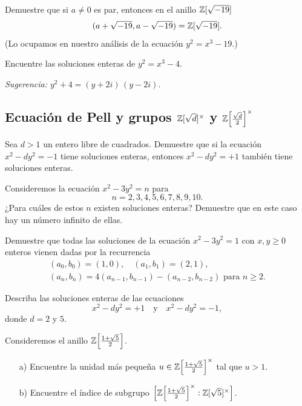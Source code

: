 \begin{ejercicio}
  Demuestre que si $a \ne 0$ es par, entonces en el anillo $\mathbb{Z} [\sqrt{-19}]$
  $$(a + \sqrt{-19}, a - \sqrt{-19}) = \mathbb{Z} [\sqrt{-19}].$$
  (Lo ocupamos en nuestro análisis de la ecuación $y^2 = x^3 - 19$.)
\end{ejercicio}

\begin{ejercicio}
  Encuentre las soluciones enteras de $y^2 = x^3 - 4$.

  \emph{Sugerencia: $y^2 + 4 = (y + 2i)\,(y - 2i)$.}
\end{ejercicio}

\subsection*{Ecuación de Pell y grupos $\mathbb{Z} [\sqrt{d}]^\times$ y $\mathbb{Z} \Bigl[\frac{\sqrt{d}}{2}\Bigr]^\times$}

\begin{ejercicio}
  Sea $d > 1$ un entero libre de cuadrados. Demuestre que si la ecuación
  $x^2 - dy^2 = -1$ tiene soluciones enteras, entonces $x^2 - dy^2 = +1$
  también tiene soluciones enteras.
\end{ejercicio}

\begin{ejercicio}
  Consideremos la ecuación $x^2 - 3y^2 = n$ para
  $$n = 2,3,4,5,6,7,8,9,10.$$
  ¿Para cuáles de estos $n$ existen soluciones enteras? Demuestre que en este
  caso hay un número infinito de ellas.
\end{ejercicio}

\begin{ejercicio}
  Demuestre que todas las soluciones de la ecuación $x^2 - 3y^2 = 1$ con
  $x,y\ge 0$ enteros vienen dadas por la recurrencia
  \begin{gather*}
    (a_0,b_0) = (1,0), \quad (a_1,b_1) = (2,1),\\
    (a_n,b_n) = 4 (a_{n-1}, b_{n-1}) - (a_{n-2}, b_{n-2}) \text{ para }n\ge 2.
  \end{gather*}
\end{ejercicio}

\begin{ejercicio}
  Describa las soluciones enteras de las ecuaciones
  $$x^2 - dy^2 = +1 \quad\text{y}\quad x^2 - dy^2 = -1,$$
  donde $d = 2$ y $5$.
\end{ejercicio}

\begin{ejercicio}
  Consideremos el anillo $\mathbb{Z} \Bigl[\frac{1+\sqrt{5}}{2}\Bigr]$.

  \begin{enumerate}
  \item[a)] Encuentre la unidad más pequeña
    $u \in \mathbb{Z} \Bigl[\frac{1+\sqrt{5}}{2}\Bigr]^\times$ tal que $u > 1$.

  \item[b)] Encuentre el índice de subgrupo
    $\Bigl[\mathbb{Z} \Bigl[\frac{1+\sqrt{5}}{2}\Bigr]^\times :
           \mathbb{Z} [\sqrt{5}]^\times\Bigr]$.
  \end{enumerate}
\end{ejercicio}

